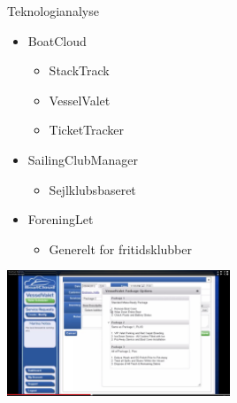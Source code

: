 \begin{frame}{Teknologianalyse}
  \begin{itemize}
    \item BoatCloud
    \begin{itemize}
      \item StackTrack
      \item VesselValet
      \item TicketTracker
    \end{itemize}
    \item SailingClubManager
    \begin{itemize}
      \item Sejlklubsbaseret
    \end{itemize}
    \item ForeningLet
    \begin{itemize}
      \item Generelt for fritidsklubber
    \end{itemize}
  \end{itemize}
  \begin{center}
  \includegraphics[width=0.5\textwidth]{images/VesselValet.jpg}
\end{center} 
    
\end{frame}

